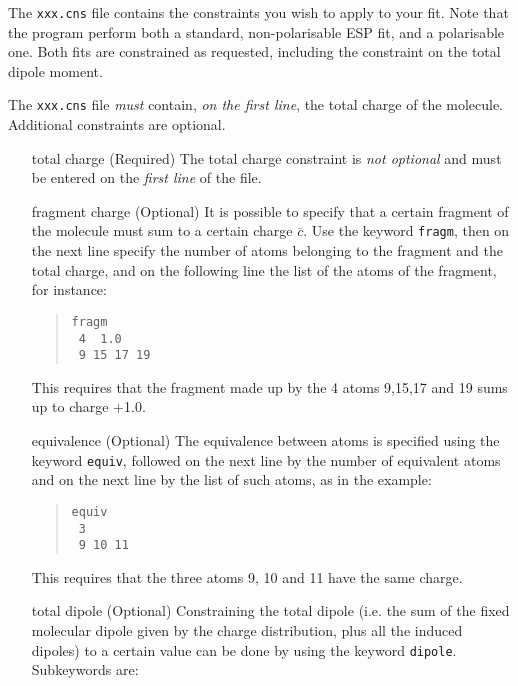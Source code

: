 \documentclass[a4paper]{report}
\begin{document}
The \texttt{xxx.cns} file contains the constraints you wish to apply to your
fit. Note that the program perform both a standard, non-polarisable ESP fit, and a
polarisable one. Both fits are constrained as requested, including the constraint on
the total dipole moment.

The \texttt{xxx.cns} file \emph{must} contain, \emph{on the first line}, the total
charge of the molecule. Additional constraints are optional.

\begin{itemize}
\item[total charge] (Required) The total charge constraint is \emph{not optional} and must be
entered on the \emph{first line} of the file.
\item[fragment charge] (Optional) It is possible to specify that a certain fragment of the molecule must sum to a certain charge $\overline{c}$. Use the keyword \texttt{fragm}, then on the next line specify the number of atoms belonging to the fragment and the total charge, and on the following line the list of
the atoms of the fragment, for instance:
\begin{framed}
\begin{quote}
\begin{verbatim}
fragm
 4  1.0
 9 15 17 19
\end{verbatim}
\end{quote}
\end{framed}
This requires that the fragment made up by the 4 atoms 9,15,17 and 19 sums up to
charge +1.0.
\item[equivalence] (Optional) The equivalence between atoms is specified using the keyword \texttt{equiv}, followed on the next line by the number of equivalent atoms and on the next line by the list of such atoms, as in the example:
\begin{framed}
\begin{quote}
\begin{verbatim}
equiv
 3
 9 10 11
\end{verbatim}
\end{quote}
\end{framed}
This requires that the three atoms 9, 10 and 11 have the same charge.
\item[total dipole] (Optional) Constraining the total dipole (i.e. the sum of the fixed molecular dipole given by the charge distribution, plus all the induced dipoles) to a certain value can be done by using the keyword \texttt{dipole}. Subkeywords are: 
\begin{itemize}

\end{itemize}
\end{itemize}
\end{document}
